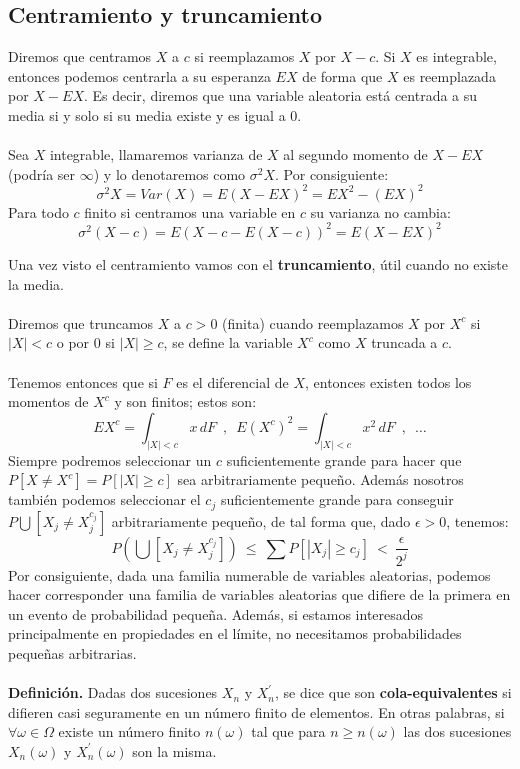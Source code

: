 \subsection{Centramiento y truncamiento}
Diremos que centramos $X$ a $c$ si reemplazamos $X$ por $X-c$. Si $X$ es integrable, entonces podemos centrarla a su esperanza $EX$ de forma que $X$ es reemplazada por $X-EX$. Es decir, diremos que una variable aleatoria está centrada a su media si y solo si su media existe y es igual a 0.
\\\\
Sea $X$ integrable, llamaremos varianza de $X$ al segundo momento de $X-EX$ (podría ser $\infty$) y lo denotaremos como $\sigma^2 X$. Por consiguiente:
$$\sigma^2 X = Var(X) = E(X-EX)^2=EX^2-(EX)^2$$
Para todo $c$ finito si centramos una variable en $c$ su varianza no cambia:
$$\sigma^2(X-c)=E(X-c-E(X-c))^2=E(X-EX)^2$$

Una vez visto el centramiento vamos con el \textbf{truncamiento}, útil cuando no existe la media.
\\\\
Diremos que truncamos $X$ a $c>0$ (finita) cuando reemplazamos $X$ por $X^c$ si $|X|<c$ o por $0$ si $|X|\geq c$, se define la variable $X^c$ como $X$ truncada a $c$. 
\\\\
Tenemos entonces que si $F$ es el diferencial de $X$, entonces existen todos los momentos de $X^c$ y son finitos; estos son:
$$EX^c=\int_{|X|<c}x\, dF\,\,\, , \,\,\, E(X^c)^2=\int_{|X|<c}x^2\, dF \,\,\, , \,\,\,  \ldots$$
Siempre podremos seleccionar un $c$ suficientemente grande para hacer que $P[X\neq X^c]=P[|X|\geq c]$ sea arbitrariamente pequeño. Además nosotros también podemos seleccionar el $c_j$ suficientemente grande para conseguir $P\bigcup [X_j\neq X_j^{c_j}]$ arbitrariamente pequeño, de tal forma que, dado $\epsilon > 0$, tenemos:
$$P\left( 
\bigcup [X_j\neq X_j^{c_j}] \right)
\ \leq \ 
\sum P[|X_j|\geq c_j] 
\ < \
\frac{\epsilon}{2^j}$$
Por consiguiente, dada una familia numerable de variables aleatorias, podemos hacer corresponder una familia de variables aleatorias que difiere de la primera en un evento de probabilidad pequeña. Además, si estamos interesados principalmente en propiedades en el límite, no necesitamos probabilidades pequeñas arbitrarias.
\\\\
\textbf{Definición. }Dadas dos sucesiones $X_n$ y $X_n^{\prime}$, se dice que son \textbf{cola-equivalentes} si difieren casi seguramente en un número finito de elementos.
En otras palabras, si $\forall \omega\in\Omega$ existe un número finito $n(\omega)$ tal que para $n\geq n(\omega)$ las dos sucesiones $X_n(\omega)$ y $X_n^{\prime}(\omega)$ son la misma.

